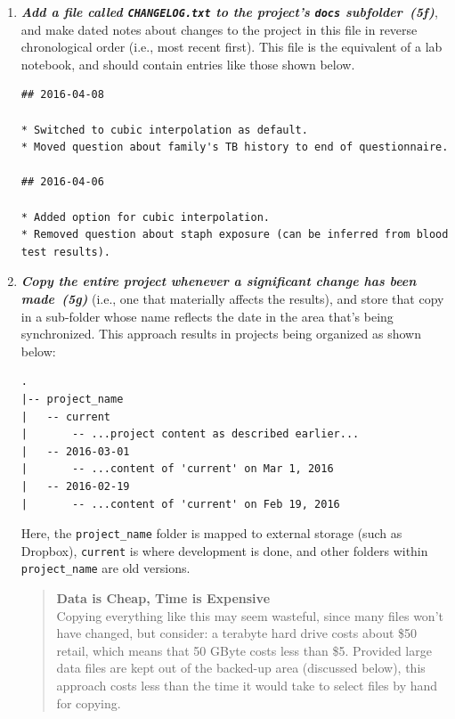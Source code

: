 \documentclass[10pt,letterpaper]{article}
\newcommand{\practice}[2]{\textbf{\emph{{#2}~({#1})}}}
\begin{document}
\begin{enumerate}

\item

  \practice{5f}{Add a file called \texttt{CHANGELOG.txt} to the
  project's \texttt{docs} subfolder}, and make dated notes about
  changes to the project in this file in reverse chronological order
  (i.e., most recent first). This file is the equivalent of a lab
  notebook, and should contain entries like those shown below.

{\small
\begin{verbatim}
## 2016-04-08

* Switched to cubic interpolation as default.
* Moved question about family's TB history to end of questionnaire.

## 2016-04-06

* Added option for cubic interpolation.
* Removed question about staph exposure (can be inferred from blood test results).
\end{verbatim}
}

\item

  \practice{5g}{Copy the entire project whenever a significant change
  has been made} (i.e., one that materially affects the results),
  and store that copy in a sub-folder whose name reflects the date in
  the area that's being synchronized. This approach results in
  projects being organized as shown below:

{\small
\begin{verbatim}
.
|-- project_name
|   -- current
|       -- ...project content as described earlier...
|   -- 2016-03-01
|       -- ...content of 'current' on Mar 1, 2016
|   -- 2016-02-19
|       -- ...content of 'current' on Feb 19, 2016
\end{verbatim}
}

  Here, the \texttt{project\_name} folder is mapped to external
  storage (such as Dropbox), \texttt{current} is where development is
  done, and other folders within \texttt{project\_name} are old
  versions.

\pagebreak

  \begin{quote}
    \noindent \textbf{Data is Cheap, Time is Expensive}
    \\
    Copying everything like this may seem wasteful, since many files
    won't have changed, but consider: a terabyte hard drive costs
    about \$50 retail, which means that 50 GByte costs less than
    \$5. Provided large data files are kept out of the backed-up area
    (discussed below), this approach costs less than the time it would
    take to select files by hand for copying.
  \end{quote}

\end{enumerate}
\end{document}
